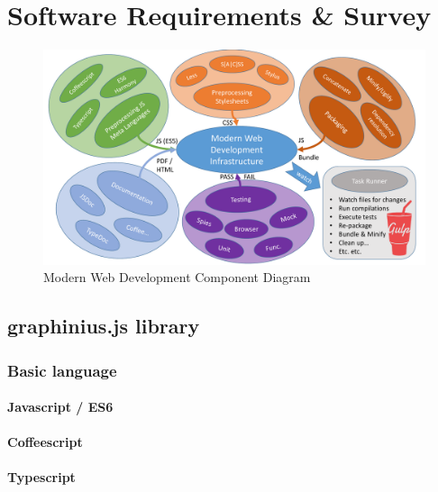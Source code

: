 \chapter{Software Requirements \& Survey}
\label{ch:software_requirements}


\begin{landscape}
\begin{figure}[ht]
	\label{fig_grunt_gulp}
	\centering
	\hspace*{-1.0cm}
	\includegraphics[width=1.8\textwidth]{figures/Modern_Web_Dev}
	\caption{Modern Web Development Component Diagram}
\end{figure}
\end{landscape}


\section{graphinius.js library}
\label{library}

	\subsection{Basic language}
	\label{ssect:language}
	
		\subsubsection{Javascript / ES6}
		\label{sssect:js_es6}
		
		\subsubsection{Coffeescript}
		\label{sssect:coffeescript}
		
		\subsubsection{Typescript}
		\label{sssect:typescript}
	
